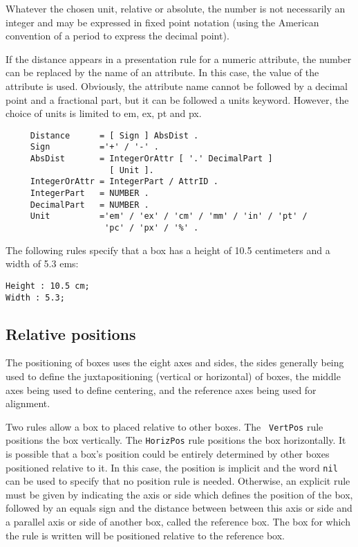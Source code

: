 Whatever the chosen unit, relative or absolute, the number is not
necessarily an integer and may be expressed in fixed point notation
(using the American convention of a period to express the decimal
point).

If the distance appears in a presentation rule for a numeric
attribute, the number can be replaced by the name of an attribute.  In
this case, the value of the attribute is used.  Obviously, the
attribute name cannot be followed by a decimal point and a fractional
part, but it can be followed a units keyword.  However, the choice of
units is limited to em, ex, pt and px.

\begin{verbatim}
     Distance      = [ Sign ] AbsDist .
     Sign          ='+' / '-' .
     AbsDist       = IntegerOrAttr [ '.' DecimalPart ]
                     [ Unit ].
     IntegerOrAttr = IntegerPart / AttrID .
     IntegerPart   = NUMBER .
     DecimalPart   = NUMBER .
     Unit          ='em' / 'ex' / 'cm' / 'mm' / 'in' / 'pt' /
                    'pc' / 'px' / '%' .
\end{verbatim}

\begin{example}
The following rules specify that a box has a height of 10.5
centimeters and a width of 5.3 ems:
\begin{verbatim}
Height : 10.5 cm;
Width : 5.3;
\end{verbatim}
\end{example}

\subsection{Relative positions}
\label{position}

The positioning of boxes uses the eight axes and sides, the sides
generally being used to define the juxtapositioning (vertical or
horizontal) of boxes, the middle axes being used to define centering,
and the reference axes being used for alignment.

Two rules allow a box to placed relative to other boxes.  The {\tt
VertPos} rule positions the box vertically.  The {\tt HorizPos} rule
positions the box horizontally.  It is possible that a box's position
could be entirely determined by other boxes positioned relative to it.
In this case, the position is implicit and the word {\tt nil} can be
used to specify that no position rule is needed.  Otherwise, an
explicit rule must be given by indicating the axis or side which
defines the position of the box, followed by an equals sign and the
distance between between this axis or side and a parallel axis or side
of another box, called the reference box.  The box for which the rule
is written will be positioned relative to the reference box.

